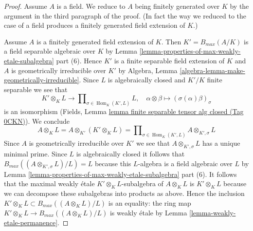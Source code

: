 \documentclass{amsart}
\theoremstyle{plain}
\theoremstyle{definition}
\theoremstyle{remark}
\numberwithin{equation}{subsection}
\def\Hom{\mathop{\mathrm{Hom}}\nolimits}
\begin{document}
\begin{proof}
\medskip\noindent
Assume $A$ is a field. We reduce to $A$ being finitely generated
over $K$ by the argument in the third paragraph of the proof.
(In fact the way we reduced to the case of a field produces
a finitely generated field extension of $K$.)

\medskip\noindent
Assume $A$ is a finitely generated field extension of $K$.
Then $K' = B_{max}(A/K)$ is a field separable algebraic over $K$ by
Lemma \ref{lemma-properties-of-max-weakly-etale-subalgebra} part (6).
Hence $K'$ is a finite separable field extension
of $K$ and $A$ is geometrically irreducible over $K'$ by
Algebra, Lemma \ref{algebra-lemma-make-geometrically-irreducible}.
Since $L$ is algebraically closed and $K'/K$ finite separable
we see that
$$
K' \otimes_K L \to \prod\nolimits_{\sigma \in \Hom_K(K', L)} L,\quad
\alpha \otimes \beta \mapsto (\sigma(\alpha)\beta)_\sigma
$$
is an isomorphism
(Fields, Lemma \href{https://stacks.math.columbia.edu/tag/0CKN}{lemma finite separable tensor alg closed (Tag 0CKN)}).
We conclude
$$
A \otimes_K L = A \otimes_{K'} (K' \otimes_K L) =
\prod\nolimits_{\sigma \in \Hom_K(K', L)} A \otimes_{K', \sigma} L
$$
Since $A$ is geometrically irreducible over $K'$ we see that
$A \otimes_{K', \sigma} L$ has a unique minimal prime.
Since $L$ is algebraically closed it follows that
$B_{max}((A \otimes_{K', \sigma} L)/L) = L$
because this $L$-algebra is a field algebraic over $L$ by
Lemma \ref{lemma-properties-of-max-weakly-etale-subalgebra} part (6).
It follows that the maximal weakly \'etale $K' \otimes_K L$-subalgebra
of $A \otimes_K L$ is $K' \otimes_K L$ because we can decompose
these subalgebras into products as above. Hence the inclusion
$K' \otimes_K L \subset B_{max}((A \otimes_K L)/L)$ is an
equality: the ring map $K' \otimes_K L \to B_{max}((A \otimes_K L)/L)$
is weakly \'etale by
Lemma \ref{lemma-weakly-etale-permanence}.
\end{proof}
\end{document}
